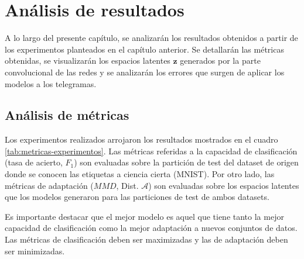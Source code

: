 \chapter{Análisis de resultados}

\label{Chapter4}

A lo largo del presente capítulo, se analizarán los resultados obtenidos a partir de los experimentos planteados en el
capítulo anterior. Se detallarán las métricas obtenidas, se visualizarán los espacios latentes $\mathbf{z}$ generados
por la parte convolucional de las redes y se analizarán los errores que surgen de aplicar los modelos a los telegramas.

\section{Análisis de métricas}

Los experimentos realizados arrojaron los resultados mostrados en el cuadro \ref{tab:metricas-experimentos}. Las
métricas referidas a la capacidad de clasificación (tasa de acierto, $F_1$) son evaluadas sobre la partición de test
del dataset de origen donde se conocen las etiquetas a ciencia cierta (MNIST). Por otro lado, las métricas de
adaptación ($MMD$, Dist. $\mathcal{A}$) son evaluadas sobre los espacios latentes que los modelos generaron para las
particiones de test de ambos datasets.

Es importante destacar que el mejor modelo es aquel que tiene tanto la mejor capacidad de clasificación como la mejor
adaptación a nuevos conjuntos de datos. Las métricas de clasificación deben ser maximizadas y las de adaptación deben
ser minimizadas.

